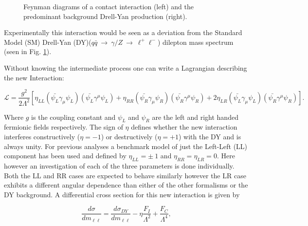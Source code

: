         \begin{figure}[h]
            \begin{center}
            \end{center}
            \caption{Feynman diagrams of a contact interaction (left) and the predominant background Drell-Yan production (right).}
            \label{fig:fd}
        \end{figure}

        Experimentally this interaction would be seen as a deviation from the Standard Model (SM) Drell-Yan (DY)($q\bar{q}~\rightarrow~\gamma/Z~\rightarrow~\ell^{+}\ell^{-}$) dilepton mass spectrum (seen in Fig. \ref{fig:fd}). 

        Without knowing the intermediate process one can write a Lagrangian describing the new Interaction: 

        \begin{equation}
            \mathcal{L} = \frac{g^{2}}{2\Lambda^{2}}
                [\eta_{LL} (\bar{\psi_{L}}\gamma_{\mu}\psi_{L}) (\bar{\psi_{L}}\gamma^{\mu}\psi_{L}) 
                + \eta_{RR} (\bar{\psi_{R}}\gamma_{\mu}\psi_{R}) (\bar{\psi_{R}}\gamma^{\mu}\psi_{R}) 
                + 2\eta_{LR} (\bar{\psi_{L}}\gamma_{\mu}\psi_{L}) (\bar{\psi_{R}}\gamma^{\mu}\psi_{R}) ].
        \end{equation}

        Where $g$ is the coupling constant and $\psi_{L}$ and $\psi_{R}$ are the left and right handed fermionic fields respectively.
        The sign of $\eta$ defines whether the new interaction interferes constructively ($\eta = -1$) or destructively ($\eta = +1$) with the DY and is always unity. For previous analyses \cite{CDF, D0, ATLAS} a benchmark model of just the Left-Left (LL) component has been used and defined by $\eta_{LL} = \pm~1$ and $\eta_{RR} = \eta_{LR} = 0$. Here however an investigation of each of the three parameters is done individually. Both the LL and RR cases are expected to behave similarly however the LR case exhibits a different angular dependence than either of the other formalisms or the DY background.
        A differential cross section for this new interaction is given by

        \begin{equation}
            \frac{d\sigma}{dm_{\ell\ell}} = 
                \frac{d\sigma_{DY}}{dm_{\ell\ell}} 
                - \eta\frac{F_{I}}{\Lambda^{2}} 
                + \frac{F_{C}}{\Lambda^{4}},
            \label{eq:DiffCross}
        \end{equation}

